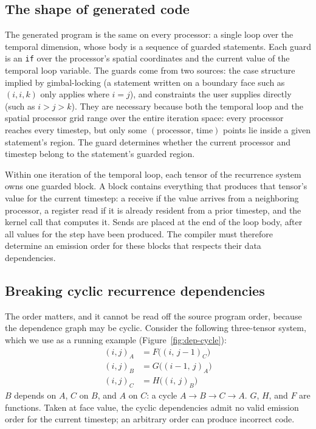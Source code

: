 \documentclass[sigplan, nonacm]{acmart}
\begin{document}
\subsection{The shape of generated code}

The generated program is the same on every processor: a single loop over the
temporal dimension, whose body is a sequence of guarded statements. Each guard
is an \texttt{if} over the processor's spatial coordinates and the current
value of the temporal loop variable. The guards come from two sources: the
case structure implied by gimbal-locking (a statement written on a boundary
face such as $(i,i,k)$ only applies where $i=j$), and constraints the user
supplies directly (such as $i > j > k$). They are necessary because both the
temporal loop and the spatial processor grid range over the entire
iteration space: every processor reaches every timestep, but only some
$(\text{processor},\, \text{time})$ points lie inside a given statement's
region. The guard determines whether the current processor and timestep belong to the statement's guarded region.

Within one iteration of the temporal loop, each tensor of the recurrence
system owns one guarded block. A block contains everything that produces that
tensor's value for the current timestep: a receive if the value arrives from a
neighboring processor, a register read if it is already resident from a prior
timestep, and the kernel call that computes it. Sends are placed at the end of
the loop body, after all values for the step have been produced. The compiler must therefore determine an emission order for these blocks that respects their data dependencies.

\subsection{Breaking cyclic recurrence dependencies}
\label{sec:live-stale}


The order matters, and it cannot be read off the source program order, because the
dependence graph may be cyclic. Consider the following three-tensor system, which we use as a
running example (Figure~\ref{fig:dep-cycle}):
%
\begin{align}
  (i,j)_{A} &= F\big((i,\,j{-}1)_{C}\big) \label{eq:abc-a}\\
  (i,j)_{B} &= G\big((i{-}1,\,j)_{A}\big) \label{eq:abc-b}\\
  (i,j)_{C} &= H\big((i,\,j)_{B}\big)     \label{eq:abc-c}
\end{align}
%
$B$ depends on $A$, $C$ on $B$, and $A$ on $C$: a cycle
$A \to B \to C \to A$. $G$, $H$, and $F$ are functions. Taken at face value, the cyclic dependencies admit no valid emission order for the current timestep; an arbitrary order can produce incorrect code.
\end{document}
